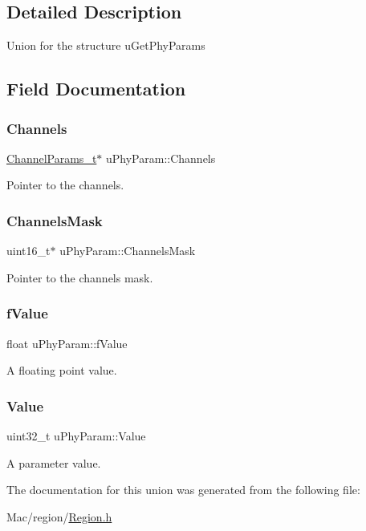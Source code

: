\subsection{Detailed Description}
Union for the structure u\+Get\+Phy\+Params 

\subsection{Field Documentation}
\mbox{\label{unionuPhyParam_a3025546f58e55d9601321e2f613ab264}} 
\subsubsection{\texorpdfstring{Channels}{Channels}}
{\footnotesize\ttfamily \hyperlink{group__LORAMAC_ga1360ca6f82c6d125ea43a9dad9b56184}{Channel\+Params\+\_\+t}$\ast$ u\+Phy\+Param\+::\+Channels}

Pointer to the channels. \mbox{\label{unionuPhyParam_a76583d386fefae802f5d11c040d04ba2}} 
\subsubsection{\texorpdfstring{Channels\+Mask}{ChannelsMask}}
{\footnotesize\ttfamily uint16\+\_\+t$\ast$ u\+Phy\+Param\+::\+Channels\+Mask}

Pointer to the channels mask. \mbox{\label{unionuPhyParam_a45e40c02153e3c6fc4b6578b217e9c5b}} 
\subsubsection{\texorpdfstring{f\+Value}{fValue}}
{\footnotesize\ttfamily float u\+Phy\+Param\+::f\+Value}

A floating point value. \mbox{\label{unionuPhyParam_aed3ac490dcac46f2b6c06566f6fdbc56}} 
\subsubsection{\texorpdfstring{Value}{Value}}
{\footnotesize\ttfamily uint32\+\_\+t u\+Phy\+Param\+::\+Value}

A parameter value. 

The documentation for this union was generated from the following file\+:\begin{DoxyCompactItemize}
\item 
Mac/region/\hyperlink{Region_8h}{Region.\+h}\end{DoxyCompactItemize}
